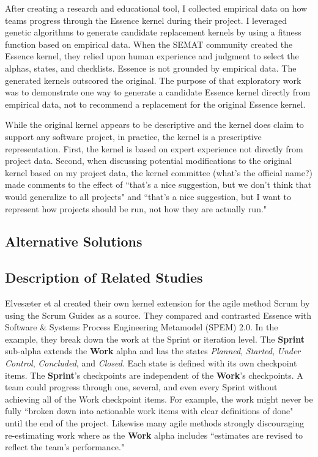 \documentclass[preprint,12pt,3p]{elsarticle}
\begin{document}

After creating a research and educational tool, I collected empirical data on how teams progress through the Essence kernel during their project. I leveraged genetic algorithms to generate candidate replacement kernels by using a fitness function based on empirical data. When the SEMAT community created the Essence kernel, they relied upon human experience and judgment to select the alphas, states, and checklists. Essence is not grounded by empirical data. The generated kernels outscored the original. The purpose of that exploratory work was to demonstrate one way to generate a candidate Essence kernel directly from empirical data, not to recommend a replacement for the original Essence kernel. \cite{SCSE2015}

While the original kernel appears to be descriptive and the kernel does claim to support any software project, in practice, the kernel is a prescriptive representation. First, the kernel is based on expert experience not directly from project data. Second, when discussing potential modifications to the original kernel based on my project data, the kernel committee (what's the official name?) made comments to the effect of ``that's a nice suggestion, but we don't think that would generalize to all projects" and ``that's a nice suggestion, but I want to represent how projects should be run, not how they are actually run." 

\subsection{Alternative Solutions}

\subsection{Description of Related Studies}

Elves{\ae}ter et al \cite{Elvesaeter2013} created their own kernel extension for the agile method Scrum \cite{Schwaber2001} by using the Scrum Guides \cite{ScrumGuide} as a source. They compared and contrasted Essence with Software \& Systems Process Engineering Metamodel (SPEM) 2.0. In the example, they break down the work at the Sprint or iteration level. The \textbf{Sprint} sub-alpha extends the \textbf{Work} alpha and has the states \textit{Planned}, \textit{Started}, \textit{Under Control}, \textit{Concluded}, and \textit{Closed}. Each state is defined with its own checkpoint items. The \textbf{Sprint}'s checkpoints are independent of the \textbf{Work}'s checkpoints. A team could progress through one, several, and even every Sprint without achieving all of the Work checkpoint items. For example, the work might never be fully ``broken down into actionable work items with clear definitions of done" until the end of the project. Likewise many agile methods strongly discouraging re-estimating work \cite{} where as the \textbf{Work} alpha includes ``estimates are revised to reflect the team’s performance."  
\end{document}
